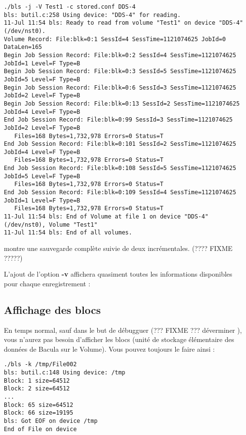 \footnotesize
\begin{verbatim}
./bls -j -V Test1 -c stored.conf DDS-4
bls: butil.c:258 Using device: "DDS-4" for reading.
11-Jul 11:54 bls: Ready to read from volume "Test1" on device "DDS-4" (/dev/nst0).
Volume Record: File:blk=0:1 SessId=4 SessTime=1121074625 JobId=0 DataLen=165
Begin Job Session Record: File:blk=0:2 SessId=4 SessTime=1121074625 JobId=1 Level=F Type=B
Begin Job Session Record: File:blk=0:3 SessId=5 SessTime=1121074625 JobId=5 Level=F Type=B
Begin Job Session Record: File:blk=0:6 SessId=3 SessTime=1121074625 JobId=2 Level=F Type=B
Begin Job Session Record: File:blk=0:13 SessId=2 SessTime=1121074625 JobId=4 Level=F Type=B
End Job Session Record: File:blk=0:99 SessId=3 SessTime=1121074625 JobId=2 Level=F Type=B
   Files=168 Bytes=1,732,978 Errors=0 Status=T
End Job Session Record: File:blk=0:101 SessId=2 SessTime=1121074625 JobId=4 Level=F Type=B
   Files=168 Bytes=1,732,978 Errors=0 Status=T
End Job Session Record: File:blk=0:108 SessId=5 SessTime=1121074625 JobId=5 Level=F Type=B
   Files=168 Bytes=1,732,978 Errors=0 Status=T
End Job Session Record: File:blk=0:109 SessId=4 SessTime=1121074625 JobId=1 Level=F Type=B
   Files=168 Bytes=1,732,978 Errors=0 Status=T
11-Jul 11:54 bls: End of Volume at file 1 on device "DDS-4" (/dev/nst0), Volume "Test1"
11-Jul 11:54 bls: End of all volumes.
\end{verbatim}
\normalsize

montre une sauvegarde complète suivie de deux incrémentales. (???? FIXME ?????)

L'ajout de l'option {\bf -v} affichera quasiment toutes les informations
disponibles pour chaque enregistrement :

\subsection{Affichage des blocs}

En temps normal, sauf dans le but de débugguer (??? FIXME ??? déverminer ), vous
n'aurez pas besoin d'afficher les blocs (unité de stockage élémentaire des 
données de Bacula sur le Volume). Vous pouvez toujours le faire ainsi :

\footnotesize
\begin{verbatim}
./bls -k /tmp/File002
bls: butil.c:148 Using device: /tmp
Block: 1 size=64512
Block: 2 size=64512
...
Block: 65 size=64512
Block: 66 size=19195
bls: Got EOF on device /tmp
End of File on device
\end{verbatim}
\normalsize

